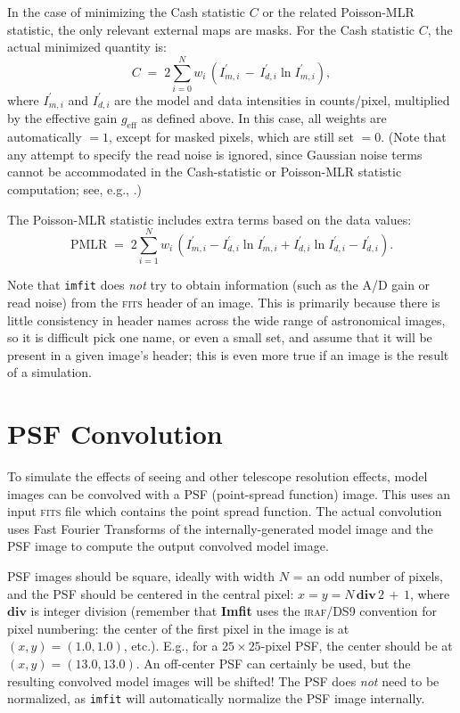 \documentclass[10pt,a4paper,article]{memoir}
\newcommand{\imfit}{\textbf{Imfit}}
\newcommand{\imfitprog}{\texttt{imfit}}
\newcommand{\pmlr}{PMLR}
\begin{document}
In the case of minimizing the Cash statistic $C$ or the related Poisson-MLR statistic, the 
only relevant external maps are masks. For the Cash statistic $C$, the actual minimized 
quantity is:
\begin{equation}
C \; = \; 2 \sum_{i = 0}^{N} w_{i} \, (I^{\prime}_{m, i} \, - \, I^{\prime}_{d, i} \ln I^{\prime}_{m, i}),
\end{equation}
where $I^{\prime}_{m, i}$ and $I^{\prime}_{d, i}$ are the model and data
intensities in counts/pixel, multiplied by the effective gain $g_{\mathrm{eff}}$ as defined 
above.  In this case, all weights are automatically $=1$, except for masked pixels, which 
are still set $= 0$. (Note that any attempt to specify the read noise is ignored, since 
Gaussian noise terms cannot be accommodated in the Cash-statistic or Poisson-MLR statistic
computation; see, e.g., \citealt{erwin14}.)

The Poisson-MLR statistic includes extra terms based on the data values:
\begin{equation}
\mathrm{\pmlr} \; = \;  2 \sum_{i = 1}^{N} w_{i} \, 
\left( I^{\prime}_{m, i} - I^{\prime}_{d, i} \ln I^{\prime}_{m, i} + I^{\prime}_{d, i} \ln I^{\prime}_{d, i} - I^{\prime}_{d, i} \right).
\end{equation}

Note that \imfitprog{} does \textit{not} try to obtain information (such as
the A/D gain or read noise) from the \textsc{fits} header of an image. This is primarily
because there is little consistency in header names across the wide range of
astronomical images, so it is difficult pick one name, or even a small set, and
assume that it will be present in a given image's header; this is even more
true if an image is the result of a simulation.




\section{PSF Convolution}

To simulate the effects of seeing and other telescope resolution effects, model
images can be convolved with a PSF (point-spread function) image. This uses an
input \textsc{fits} file which contains the point spread function. The actual convolution
uses Fast Fourier Transforms of the internally-generated model image and the PSF
image to compute the output convolved model image.

PSF images should be square, ideally with width $N$ = an odd number of
pixels, and the PSF should be centered in the central pixel: $x = y = N \,
\mathbf{div} \, 2 \, + \, 1$, where $\mathbf{div}$ is integer division (remember
that \imfit{} uses the \textsc{iraf}/DS9 convention for pixel numbering: the center
of the first pixel in the image is at $(x,y) = (1.0,1.0)$, etc.).
E.g., for a $25 \times 25$-pixel PSF, the center should be at $(x,y) =
(13.0,13.0)$. An off-center PSF can certainly be used, but the resulting
convolved model images will be shifted! The PSF does \textit{not} need
to be normalized, as \imfitprog{} will automatically normalize the PSF
image internally.
\end{document}
